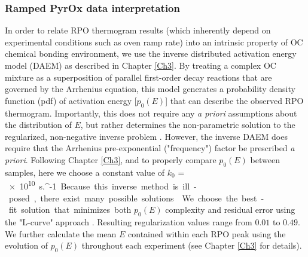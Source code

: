 \subsubsection{Ramped PyrOx data interpretation}\label{Ch6SD2}

In order to relate RPO thermogram results (which inherently depend on experimental conditions such as oven ramp rate) into an intrinsic property of OC chemical bonding environment, we use the inverse distributed activation energy model (DAEM) as described in Chapter \ref{Ch3}. By treating a complex OC mixture as a superposition of parallel first-order decay reactions that are governed by the Arrhenius equation, this model generates a probability density function (pdf) of activation energy [$p_{0}(E)$] that can describe the observed RPO thermogram. Importantly, this does not require any \textit{a priori} assumptions about the distribution of $E$, but rather determines the non-parametric solution to the regularized, non-negative inverse problem \citep[][Chapter \ref{Ch3}]{Forney:2012dr,Forney:2012hz}. However, the inverse DAEM does require that the Arrhenius pre-exponential ("frequency") factor be prescribed \textit{a priori}. Following Chapter \ref{Ch3}, and to properly compare $p_{0}(E)$ between samples, here we choose a constant value of $k_{0}$ = \SI{e10}{s.^{-1}}. Because this inverse method is ill-posed, there exist many possible solutions \citep{Hansen:1994uc}. We choose the best-fit solution that minimizes both $p_{0}(E)$ complexity \citep[as measured by the roughness norm;][]{Forney:2012dr} and residual error using the "L-curve" approach \citep{Tikhonov:1977ui,Hansen:1994uc}. Resulting regularization  values range from $0.01$ to $0.49$. We further calculate the mean $E$ contained within each RPO peak using the evolution of $p_{0}(E)$ throughout each experiment (see Chapter \ref{Ch3} for details).

